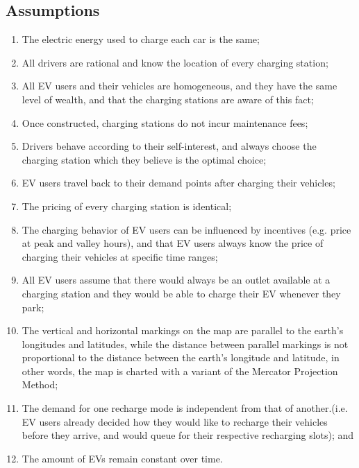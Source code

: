 \documentclass[10pt]{article}
\begin{document}
\subsection{Assumptions}
\begin{enumerate}
\item 
The electric energy used to charge each car is the same;
\item 
All drivers are rational and know the location of every charging station;
\item 
All EV users and their vehicles are homogeneous, and they have the same level of wealth, and that the charging stations are aware of this fact;
\item 
Once constructed, charging stations do not incur maintenance fees;
\item 
Drivers behave according to their self-interest, and always choose the charging station which they believe is the optimal choice;
\item EV users travel back to their demand points after charging their vehicles;
\item The pricing of every charging station is identical;
\item The charging behavior of EV users can be influenced by incentives (e.g. price at peak and valley hours), and that EV users always know the price of charging their vehicles at specific time ranges;
\item All EV users assume that there would always be an outlet available at a charging station and they would be able to charge their EV whenever they park;
\item The vertical and horizontal markings on the map are parallel to the earth's longitudes and latitudes, while the distance between parallel markings is not proportional to the distance between the earth's longitude and latitude, in other words, the map is charted with a variant of the Mercator Projection Method; 
\item The demand for one recharge mode is independent from that of another.(i.e. EV users already decided how they would like to recharge their vehicles before they arrive, and would queue for their respective recharging slots); and
\item The amount of EVs remain constant over time.
\end{enumerate}
\newpage
\end{document}
